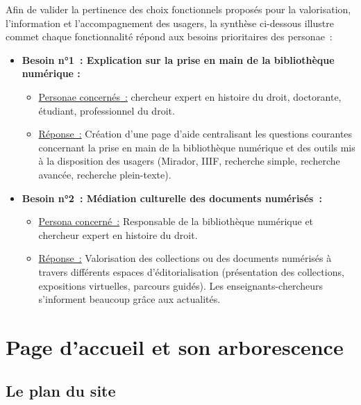 Afin de valider la pertinence des choix fonctionnels proposés pour la valorisation, l’information et l’accompagnement des usagers, la synthèse ci-dessous illustre commet chaque fonctionnalité répond aux besoins prioritaires des personae :
\begin{itemize}
	\item \textbf{Besoin n°1 : Explication sur la prise en main de la bibliothèque numérique :}
\begin{itemize}
	\item \uline{Personae concernés :} chercheur expert en histoire du droit, doctorante, étudiant, professionnel du droit.
\item \uline{Réponse :} Création d’une page d’aide centralisant les questions courantes concernant la prise en main de la bibliothèque numérique et des outils mis à la disposition des usagers (Mirador, IIIF, recherche simple, recherche avancée, recherche plein-texte).
\end{itemize}
\item \textbf{Besoin n°2 : Médiation culturelle des documents numérisés :}
\begin{itemize}
	\item \uline{Persona concerné :} Responsable de la bibliothèque numérique et chercheur expert en histoire du droit.
\item \uline{Réponse :} Valorisation des collections ou des documents numérisés à travers différents espaces d’éditorialisation (présentation des collections, expositions virtuelles, parcours guidés). Les enseignants-chercheurs s’informent beaucoup grâce aux actualités.
\end{itemize}
\end{itemize}

\section[Page d'accueil]{Page d’accueil et son arborescence}
\subsection{Le plan du site}

